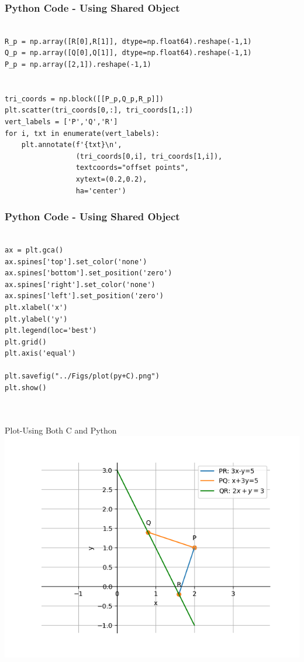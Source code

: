 \documentclass{beamer}
\begin{document}
\begin{frame}[fragile]
    \frametitle{Python Code - Using Shared Object}
    \begin{lstlisting}
    
R_p = np.array([R[0],R[1]], dtype=np.float64).reshape(-1,1)
Q_p = np.array([Q[0],Q[1]], dtype=np.float64).reshape(-1,1)
P_p = np.array([2,1]).reshape(-1,1)


tri_coords = np.block([[P_p,Q_p,R_p]])
plt.scatter(tri_coords[0,:], tri_coords[1,:])
vert_labels = ['P','Q','R']
for i, txt in enumerate(vert_labels):
    plt.annotate(f'{txt}\n',
                 (tri_coords[0,i], tri_coords[1,i]), 
                 textcoords="offset points", 
                 xytext=(0.2,0.2), 
                 ha='center') 

\end{lstlisting}
\end{frame}

\begin{frame}[fragile]
    \frametitle{Python Code - Using Shared Object}
    \begin{lstlisting}
    
ax = plt.gca()
ax.spines['top'].set_color('none')
ax.spines['bottom'].set_position('zero')
ax.spines['right'].set_color('none')
ax.spines['left'].set_position('zero')
plt.xlabel('x')
plt.ylabel('y')
plt.legend(loc='best')
plt.grid()
plt.axis('equal')

plt.savefig("../Figs/plot(py+C).png")
plt.show()



\end{lstlisting}
\end{frame}

\begin{frame}{Plot-Using Both C and Python}
    \centering
    \includegraphics[width=\columnwidth, height=0.8\textheight, keepaspectratio]{Figs/plot(py+C).png}     
\end{frame}
\end{document}

